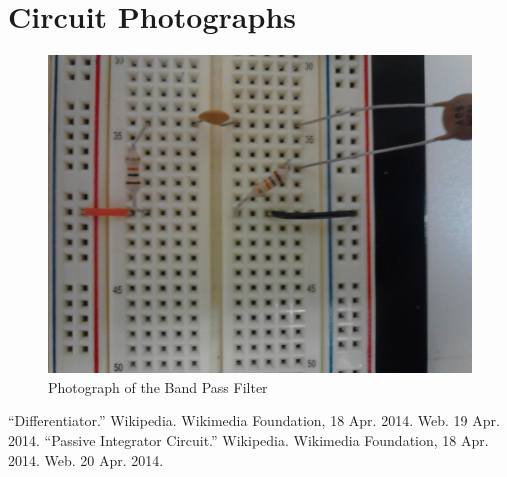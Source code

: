 \documentclass[twocolumn,english]{IEEEtran}
\theoremstyle{plain}
\theoremstyle{plain}
\begin{document}
\section{Circuit Photographs}
\begin{figure}[H]
			\begin{centering}
			\begin{center}
			\includegraphics[width=\linewidth]{./bp_photo.png}
			\caption{Photograph of the Band Pass Filter}
			\label{graph:bp_photo}
			\end{center}
			\par\end{centering}
		\end{figure}


%
%

\begin{thebibliography}{9}
\centering
{}
	``Differentiator.''
	Wikipedia.
	Wikimedia Foundation, 18 Apr. 2014.
	Web.
	19 Apr. 2014.
	``Passive Integrator Circuit.''
	Wikipedia.
	Wikimedia Foundation, 18 Apr. 2014.
	Web.
	20 Apr. 2014.
\end{thebibliography}
\end{document}
